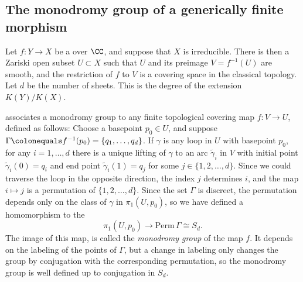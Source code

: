 \subsection*{The monodromy group of a generically finite morphism}

Let $f : Y \to X$ be a 
over $\CC$, and suppose that $X$ is irreducible. There is then
a Zariski open subset $U \subset X$ such that $U$ and
its preimage $V = f^{-1}(U)$ are smooth, and the restriction of $f$
to $V$ is a covering space in the classical topology. Let $d$ be the
%
number of sheets. This is the degree of the extension $K(Y)/K(X)$.

%
associates a monodromy group to any finite
topological covering map $f : V \to U$, defined as follows: Choose a
basepoint $p_0 \in U$, and suppose $\Gamma \colonequals  f^{-1}(p_0)  =
\{q_1,\dots,q_d\}$. If $\gamma$ is any loop in $U$ with basepoint $p_0$,
for any $i = 1, \dots, d$ there is a unique lifting of $\gamma$ to an
arc $\tilde \gamma_i$ in $V$ with initial point $\tilde \gamma_i(0)
= q_i$ and end point $\tilde \gamma_i(1) = q_j$ for some $j \in
\{1,2,\dots,d\}$. Since we could traverse the loop in the opposite
direction, the index $j$ determines $i$, and the map $i\mapsto j$ is a
permutation of $\{1,2,\dots,d\}$.
Since the set $\Gamma$ is discreet, the permutation depends only on the
class of $\gamma$ in $\pi_1(U,p_0)$, so we have defined a homomorphism
to the 
%
$$
\pi_1(U,p_0)  \to \mathrm{ Perm}\,\Gamma \cong S_d.
$$
The image of this map,
is called the \emph{monodromy group} of the
%
map $f$. It depends on the labeling of the points of $\Gamma$, but a
change in labeling
only changes the group by conjugation with the corresponding permutation,
so the monodromy group is well defined up to
conjugation in $S_{d}$.
\vspace*{3pt}

